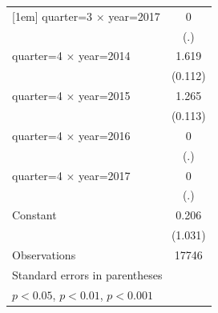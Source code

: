 {\begin{tabular}{l*{1}{c}}
[1em]
quarter=3 $\times$ year=2017&           0         \\
                    &         (.)         \\
[1em]
quarter=4 $\times$ year=2014&       1.619\sym{***}\\
                    &     (0.112)         \\
[1em]
quarter=4 $\times$ year=2015&       1.265\sym{***}\\
                    &     (0.113)         \\
[1em]
quarter=4 $\times$ year=2016&           0         \\
                    &         (.)         \\
[1em]
quarter=4 $\times$ year=2017&           0         \\
                    &         (.)         \\
[1em]
Constant            &       0.206         \\
                    &     (1.031)         \\
\hline
Observations        &       17746         \\
\hline\hline
\multicolumn{2}{l}{\footnotesize Standard errors in parentheses}\\
\multicolumn{2}{l}{\footnotesize \sym{*} \(p<0.05\), \sym{**} \(p<0.01\), \sym{***} \(p<0.001\)}\\
\end{tabular}
}
